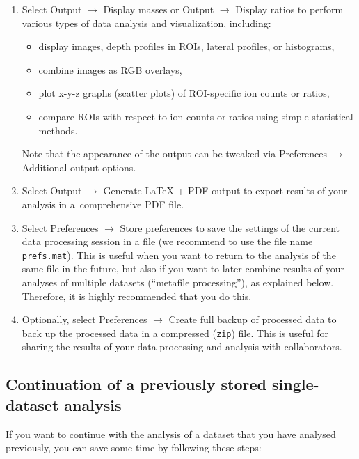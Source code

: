 \documentclass[a4paper, 11pt]{article}
\newcommand{\ttt}[1]{\texttt{#1}}
\newcommand{\lans}[1]{{\color{magenta}#1}}
\newcommand{\lanscb}[1]{{\color{darkgreen}#1}}
\newcommand\ra{\rightarrow}
\newcounter{step}
\begin{document}
\begin{enumerate}
\item Select \lans{Output} $\ra$ \lans{Display masses} or \lans{Output} $\ra$ \lans{Display ratios} to perform various types of data analysis and visualization, including:

\begin{itemize}
\item display \lanscb{images}, \lanscb{depth profiles in ROIs}, \lanscb{lateral profiles}, or \lanscb{histograms},
\item \lanscb{combine images as RGB} overlays,
\item \lanscb{plot x-y-z graphs} (scatter plots) of ROI-specific ion counts or ratios,  
\item \lanscb{compare ROIs} with respect to ion counts or ratios using simple statistical methods.
\end{itemize}
%
Note that the appearance of the output can be tweaked via \lans{Preferences} $\ra$ \lans{Additional output options}.

\item Select \lans{Output} $\ra$ \lans{Generate LaTeX + PDF output} to export results of your analysis in a~comprehensive PDF file. 

\item Select \lans{Preferences} $\ra$ \lans{Store preferences} to save the settings of the current data processing session in a file (we recommend to use the file name \ttt{prefs.mat}). This is useful when you want to return to the analysis of the same file in the future, but also if you want to later combine results of your analyses of multiple datasets (``metafile processing''), as explained below. Therefore, it is highly recommended that you do this.

\item Optionally, select \lans{Preferences} $\ra$ \lans{Create full backup of processed data} to back up the processed data in a compressed (\ttt{zip}) file. This is useful for sharing the results of your data processing and analysis with collaborators.

\end{enumerate}


\subsection{Continuation of a previously stored single-dataset analysis}

If you want to continue with the analysis of a dataset that you have analysed previously, you can save some time by following these steps:
\end{document}
